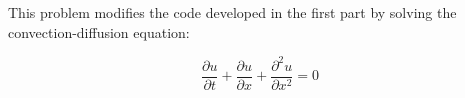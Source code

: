 \documentclass[10pt]{article}
\newcommand{\beq}{\begin{equation}}
\newcommand{\eeq}{\end{equation}}
\begin{document}
\section{}

This problem modifies the code developed in the first part by solving the convection-diffusion equation:

\beq
\frac{\partial u}{\partial t}+\frac{\partial u}{\partial x}+\frac{\partial^2 u}{\partial x^2}=0
\eeq





\begin{comment}
\begin{figure}[H]
\centering
\texttt{[image: figures/difference1.png]}
\caption{Difference between the Godunov solution and the Roe solution at various time steps.}
\end{figure}
\end{comment}









\begin{comment}
\section{Appendix}
\subsection{Question 1}
\subsubsection{{\tt flux.m}}
This function calculates the flux given a density.

\end{comment}
\end{document}
